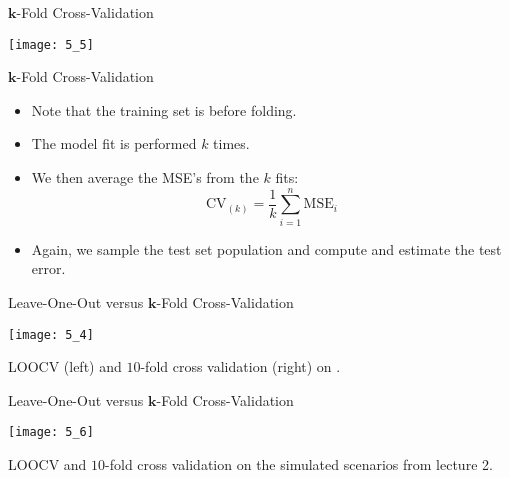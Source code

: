 \documentclass[mathserif, aspectratio=169]{beamer}
\begin{document}
\begin{frame}{$\bm{k}$-Fold Cross-Validation}
	\begin{center}
		\texttt{[image: 5\_5]}
	\end{center}
\end{frame}

\begin{frame}{$\bm{k}$-Fold Cross-Validation}
	\begin{itemize}
		\item Note that the training set is  before folding.
		\item The model fit is performed $k$ times.
		\item We then average the MSE's from the $k$ fits:
			\[ 
				\text{CV}_{(k)} = 
				\frac{1}{k}\sum_{i=1}^{n} \text{MSE}_i
			\]
		\item Again, we sample the test set population and compute and estimate
			the test error.
	\end{itemize}
\end{frame}

\begin{frame}{Leave-One-Out versus $\bm{k}$-Fold Cross-Validation}
	\begin{center}
		\texttt{[image: 5\_4]}

		LOOCV (left) and $10$-fold cross validation (right) on .
	\end{center}
\end{frame}

\begin{frame}{Leave-One-Out versus $\bm{k}$-Fold Cross-Validation}
	\begin{center}
		\texttt{[image: 5\_6]}

		LOOCV and $10$-fold cross validation on the simulated scenarios from lecture 2.
	\end{center}
\end{frame}
\end{document}
